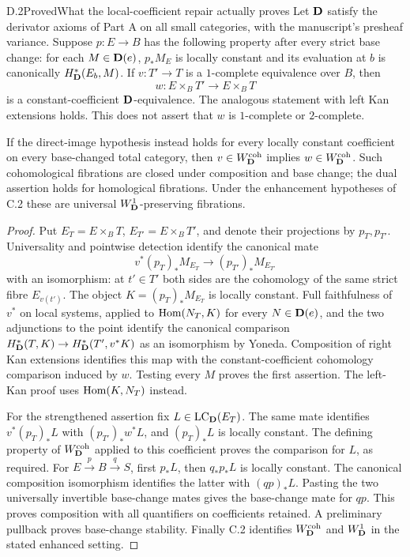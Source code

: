 \begin{claim}{D.2}{Proved}{What the local-coefficient repair actually proves}
Let $\mathbf D$ satisfy the derivator axioms of Part A on all small categories, with the manuscript's presheaf variance. Suppose $p:E\to B$ has the following property after every strict base change: for each $M\in\mathbf D(e)$, $p_*M_E$ is locally constant and its evaluation at $b$ is canonically $H^*_{\mathbf D}(E_b,M)$. If $v:T'\to T$ is a $1$-complete equivalence over $B$, then
\[
 w:E\times_BT'\longrightarrow E\times_BT
\]
is a constant-coefficient $\mathbf D$-equivalence. The analogous statement with left Kan extensions holds. This does not assert that $w$ is $1$-complete or $2$-complete.

If the direct-image hypothesis instead holds for every locally constant coefficient on every base-changed total category, then $v\in W^{\mathrm{coh}}_{\mathbf D}$ implies $w\in W^{\mathrm{coh}}_{\mathbf D}$. Such cohomological fibrations are closed under composition and base change; the dual assertion holds for homological fibrations. Under the enhancement hypotheses of C.2 these are universal $W^1_{\mathbf D}$-preserving fibrations.
\end{claim}
\begin{proof}
Put $E_T=E\times_BT$, $E_{T'}=E\times_BT'$, and denote their projections by $p_T,p_{T'}$. Universality and pointwise detection identify the canonical mate
\[
 v^*(p_T)_*M_{E_T}\longrightarrow(p_{T'})_*M_{E_{T'}}
\]
with an isomorphism: at $t'\in T'$ both sides are the cohomology of the same strict fibre $E_{v(t')}$. The object $K=(p_T)_*M_{E_T}$ is locally constant. Full faithfulness of $v^*$ on local systems, applied to $\operatorname{Hom}(N_T,K)$ for every $N\in\mathbf D(e)$, and the two adjunctions to the point identify the canonical comparison
$H^*_{\mathbf D}(T,K)\to H^*_{\mathbf D}(T',v^*K)$ as an isomorphism by Yoneda. Composition of right Kan extensions identifies this map with the constant-coefficient cohomology comparison induced by $w$. Testing every $M$ proves the first assertion. The left-Kan proof uses $\operatorname{Hom}(K,N_T)$ instead.

For the strengthened assertion fix $L\in\operatorname{LC}_{\mathbf D}(E_T)$. The same mate identifies $v^*(p_T)_*L$ with $(p_{T'})_*w^*L$, and $(p_T)_*L$ is locally constant. The defining property of $W^{\mathrm{coh}}_{\mathbf D}$ applied to this coefficient proves the comparison for $L$, as required. For $E\xrightarrow{p}B\xrightarrow{q}S$, first $p_*L$, then $q_*p_*L$ is locally constant. The canonical composition isomorphism identifies the latter with $(qp)_*L$. Pasting the two universally invertible base-change mates gives the base-change mate for $qp$. This proves composition with all quantifiers on coefficients retained. A preliminary pullback proves base-change stability. Finally C.2 identifies $W^{\mathrm{coh}}_{\mathbf D}$ and $W^1_{\mathbf D}$ in the stated enhanced setting.
\end{proof}

